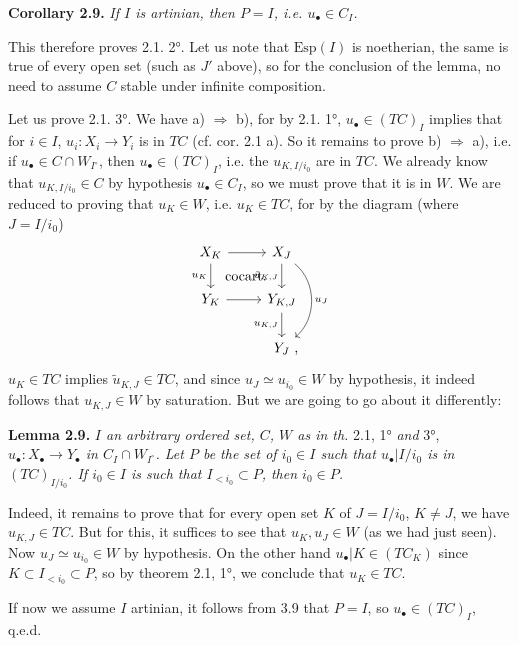 \noindent\textbf{Corollary 2.9.} \textit{If $I$ is artinian, then $P = I$, i.e. $u_\bullet \in C_I$.}

This therefore proves 2.1. 2°. Let us note that $\mathrm{Esp}(I)$ is noetherian, the same is true of every open set (such as $J'$ above), so  for the conclusion of the lemma, no need to assume $C$ stable under infinite composition.


Let us prove 2.1. 3°. We have a) $\Longrightarrow$ b), for by 2.1. 1°, $u_\bullet \in (TC)_I$ implies that for $i \in I$, $u_i : X_i \longrightarrow Y_i$ is in $TC$ (cf. cor. 2.1 a). So it remains to prove b) $\Longrightarrow$ a), i.e. if $u_\bullet \in C \cap W_{I^\circ}$, then $u_\bullet \in (TC)_I$, i.e. the $u_{K,I/i_0}$ are in $TC$. We already know that $u_{K,I/i_0} \in C$ by hypothesis $u_\bullet \in C_I$, so we must prove that it is in $W$. We are reduced to proving that $u_K \in W$, i.e. $u_K \in TC$, for by the diagram (where $J = I/i_0$)
\[
\begin{tikzcd}
X_K \arrow[r] \arrow[d, "u_K"'] \arrow[dr, phantom, "\text{cocart.}"] & X_J \arrow[d, "\tilde{u}_{K,J}"'] \arrow[dd, bend left=50, "u_J"] \\
Y_K \arrow[r] & Y_{K,J} \arrow[d, "u_{K,J}"'] \\
& Y_J \rlap{\ ,}
\end{tikzcd}
\]
$u_K \in TC$ implies $\tilde{u}_{K,J} \in TC$, and since $u_J \simeq u_{i_0} \in W$ by hypothesis, it indeed follows that $u_{K,J} \in W$ by saturation. But we are going to go about it differently:


\noindent\textbf{Lemma 2.9.} \textit{$I$ an arbitrary ordered set, $C$, $W$ as in th.} 2.1, 1° \textit{and} 3°, \textit{$u_\bullet : X_\bullet \longrightarrow Y_\bullet$ in $C_I \cap W_{I^\circ}$. Let $P$ be the set of $i_0 \in I$ such that $u_\bullet|I/i_0$ is in $(TC)_{I/i_0}$. If $i_0 \in I$ is such that $I_{<i_0} \subset P$, then $i_0 \in P$.}

Indeed, it remains to prove that for every open set $K$ of $J = I/i_0$, $K \neq J$, we have $u_{K,J} \in TC$. But for this, it suffices to see that $u_K, u_J \in W$ (as we had just seen). Now $u_J \simeq u_{i_0} \in W$ by hypothesis. On the other hand $u_\bullet|K \in (TC_K)$ since $K \subset I_{<i_0} \subset P$, so by theorem 2.1, 1°, we conclude that $u_K \in TC$.

If now we assume $I$ artinian, it follows from 3.9 that $P = I$, so $u_\bullet \in (TC)_I$, q.e.d. %

